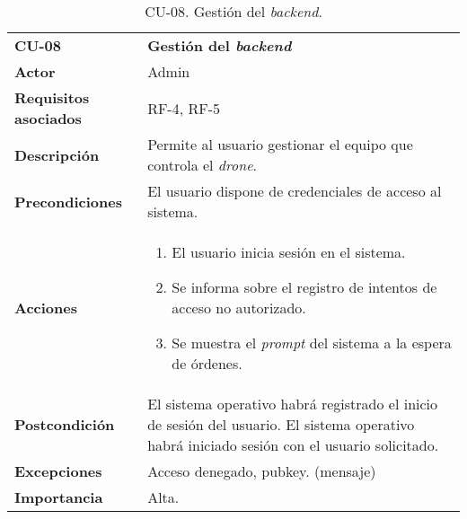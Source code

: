 \begin{table}
	\begin{center}
		\begin{tabular}{m{3cm}  m{10cm}}\hline
			\toprule
			\textbf{CU-08} & \textbf{Gestión del \emph{backend}}\\
			\otoprule
			\textbf{Actor} & Admin\\
			\textbf{Requisitos asociados} & RF-4, RF-5\\
			\textbf{Descripción} & Permite al usuario gestionar el equipo que controla el \emph{drone}.\\
			\textbf{Precondiciones} & El usuario dispone de credenciales de acceso al sistema.\\
			\textbf{Acciones} & \begin{enumerate}
											\item El usuario inicia sesión en el sistema.
											\item Se informa sobre el registro de intentos de acceso no autorizado.
											\item Se muestra el \emph{prompt} del sistema a la espera de órdenes.
											\end{enumerate}\\
			
			\textbf{Postcondición} & El sistema operativo habrá registrado el inicio de sesión del usuario. El sistema operativo habrá iniciado sesión con el usuario solicitado.\\
			\textbf{Excepciones} & Acceso denegado, pubkey. (mensaje)\\
			\textbf{Importancia} & Alta.\\
			\hline
			\bottomrule
		\end{tabular}
		\caption{CU-08. Gestión del \emph{backend}.}
		\label{tb:CU08}
	\end{center}
\end{table}


